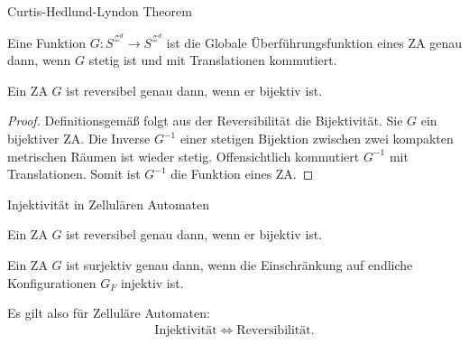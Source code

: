 \documentclass[aspectratio=169]{beamer}
\begin{document}
  \begin{frame}{Curtis-Hedlund-Lyndon Theorem}
    \begin{theorem*}
      Eine Funktion $G: S^{\mathcal{Z}^d} \to S^{\mathcal{Z}^d}$ ist die Globale Überführungsfunktion eines ZA genau dann, wenn $G$ stetig ist und mit Translationen kommutiert.
    \end{theorem*}

    \pause

    \begin{corollary*}
      Ein ZA $G$ ist reversibel genau dann, wenn er bijektiv ist.
    \end{corollary*}

    \begin{proof}
      Definitionsgemäß folgt aus der Reversibilität die Bijektivität.
      Sie $G$ ein bijektiver ZA. Die Inverse $G^{-1}$ einer stetigen Bijektion zwischen zwei kompakten metrischen Räumen ist wieder stetig. Offensichtlich kommutiert $G^{-1}$ mit Translationen. Somit ist $G^{-1}$ die Funktion eines ZA.
    \end{proof}
  \end{frame}


  \begin{frame}{Injektivität in Zellulären Automaten}
    \begin{corollary*}
      Ein ZA $G$ ist reversibel genau dann, wenn er bijektiv ist.
    \end{corollary*}

    \pause

    \begin{theorem*}
      Ein ZA $G$ ist surjektiv genau dann, wenn die Einschränkung auf endliche Konfigurationen $G_F$ injektiv ist.
    \end{theorem*}

    \pause

    Es gilt also für Zelluläre Automaten:
    \begin{align*}
      \text{Injektivität} \Leftrightarrow \text{Reversibilität}.
    \end{align*}
  \end{frame}
\end{document}
